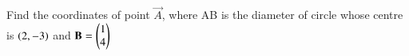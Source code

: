 Find the coordinates of point $\vec{A}$, where AB is the diameter of circle whose centre is $\left(2,-3\right)$ and $\mathbf{B}=\begin{pmatrix}1\\4\end{pmatrix}$